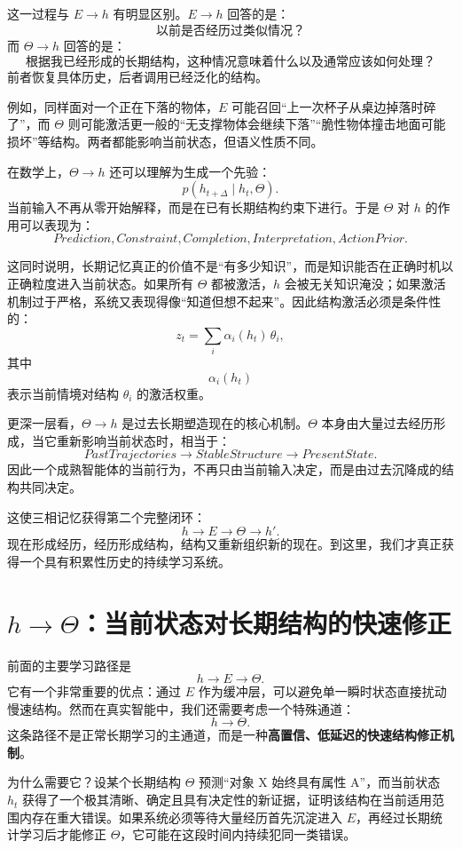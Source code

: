 这一过程与 $E\rightarrow h$ 有明显区别。$E\rightarrow h$ 回答的是：
\[
\text{以前是否经历过类似情况？}
\]
而 $\Theta\rightarrow h$ 回答的是：
\[
\text{根据我已经形成的长期结构，这种情况意味着什么以及通常应该如何处理？}
\]
前者恢复具体历史，后者调用已经泛化的结构。

例如，同样面对一个正在下落的物体，$E$ 可能召回“上一次杯子从桌边掉落时碎了”，而 $\Theta$ 则可能激活更一般的“无支撑物体会继续下落”“脆性物体撞击地面可能损坏”等结构。两者都能影响当前状态，但语义性质不同。

在数学上，$\Theta\rightarrow h$ 还可以理解为生成一个先验：
\[
p(h_{t+\Delta}\mid h_t,\Theta).
\]
当前输入不再从零开始解释，而是在已有长期结构约束下进行。于是 $\Theta$ 对 $h$ 的作用可以表现为：
\[
\boxed{
Prediction,
Constraint,
Completion,
Interpretation,
ActionPrior.
}
\]

这同时说明，长期记忆真正的价值不是“有多少知识”，而是知识能否在正确时机以正确粒度进入当前状态。如果所有 $\Theta$ 都被激活，$h$ 会被无关知识淹没；如果激活机制过于严格，系统又表现得像“知道但想不起来”。因此结构激活必须是条件性的：
\[
z_t
=
\sum_i
\alpha_i(h_t)\,
\theta_i,
\]
其中
\[
\alpha_i(h_t)
\]
表示当前情境对结构 $\theta_i$ 的激活权重。

更深一层看，$\Theta\rightarrow h$ 是过去长期塑造现在的核心机制。$\Theta$ 本身由大量过去经历形成，当它重新影响当前状态时，相当于：
\[
PastTrajectories
\rightarrow
StableStructure
\rightarrow
PresentState.
\]
因此一个成熟智能体的当前行为，不再只由当前输入决定，而是由过去沉降成的结构共同决定。

这使三相记忆获得第二个完整闭环：
\[
h
\rightarrow
E
\rightarrow
\Theta
\rightarrow
h'.
\]
现在形成经历，经历形成结构，结构又重新组织新的现在。到这里，我们才真正获得一个具有积累性历史的持续学习系统。

\section{$h\rightarrow\Theta$：当前状态对长期结构的快速修正}

前面的主要学习路径是
\[
h\rightarrow E\rightarrow\Theta.
\]
它有一个非常重要的优点：通过 $E$ 作为缓冲层，可以避免单一瞬时状态直接扰动慢速结构。然而在真实智能中，我们还需要考虑一个特殊通道：
\[
\boxed{
h\rightarrow\Theta.
}
\]
这条路径不是正常长期学习的主通道，而是一种\textbf{高置信、低延迟的快速结构修正机制}。

为什么需要它？设某个长期结构 $\Theta$ 预测“对象 X 始终具有属性 A”，而当前状态 $h_t$ 获得了一个极其清晰、确定且具有决定性的新证据，证明该结构在当前适用范围内存在重大错误。如果系统必须等待大量经历首先沉淀进入 $E$，再经过长期统计学习后才能修正 $\Theta$，它可能在这段时间内持续犯同一类错误。

